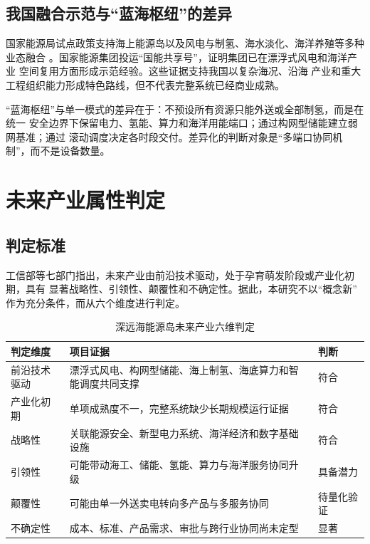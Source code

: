 \subsection{我国融合示范与“蓝海枢纽”的差异}

国家能源局试点政策支持海上能源岛以及风电与制氢、海水淡化、海洋养殖等多种业态融合
\cite{nea-demo}。国家能源集团投运“国能共享号”，证明集团已在漂浮式风电和海洋产业
空间复用方面形成示范经验\cite{chnenergy-sharing}。这些证据支持我国以复杂海况、沿海
产业和重大工程组织能力形成特色路线，但不代表完整系统已经商业成熟。

“蓝海枢纽”与单一模式的差异在于：不预设所有资源只能外送或全部制氢，而是在统一
安全边界下保留电力、氢能、算力和海洋用能端口；通过构网型储能建立弱网基准；通过
滚动调度决定各时段交付。差异化的判断对象是“多端口协同机制”，而不是设备数量。

\section{未来产业属性判定}

\subsection{判定标准}

工信部等七部门指出，未来产业由前沿技术驱动，处于孕育萌发阶段或产业化初期，具有
显著战略性、引领性、颠覆性和不确定性\cite{miit-future}。据此，本研究不以“概念新”
作为充分条件，而从六个维度进行判定。

\begin{table}[H]
\centering
\caption{深远海能源岛未来产业六维判定}
\label{tab:c2-six-dimensions}
\begin{tabularx}{\textwidth}{p{2.4cm} X p{2.6cm}}
\toprule
判定维度 & 项目证据 & 判断\\
\midrule
前沿技术驱动 & 漂浮式风电、构网型储能、海上制氢、海底算力和智能调度共同支撑 & 符合\\
产业化初期 & 单项成熟度不一，完整系统缺少长期规模运行证据 & 符合\\
战略性 & 关联能源安全、新型电力系统、海洋经济和数字基础设施 & 符合\\
引领性 & 可能带动海工、储能、氢能、算力与海洋服务协同升级 & 具备潜力\\
颠覆性 & 可能由单一外送卖电转向多产品与多服务协同 & 待量化验证\\
不确定性 & 成本、标准、产品需求、审批与跨行业协同尚未定型 & 显著\\
\bottomrule
\end{tabularx}
\end{table}

